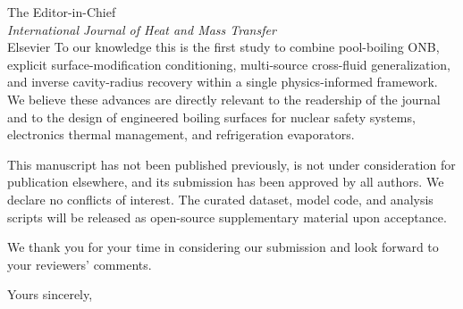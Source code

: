\documentclass[11pt,a4paper]{letter}
\begin{document}
\begin{letter}{The Editor-in-Chief\\
\emph{International Journal of Heat and Mass Transfer}\\
Elsevier}
To our knowledge this is the first study to combine pool-boiling ONB,
explicit surface-modification conditioning, multi-source cross-fluid
generalization, and inverse cavity-radius recovery within a single
physics-informed framework. We believe these advances are directly
relevant to the readership of the journal and to the design of
engineered boiling surfaces for nuclear safety systems, electronics
thermal management, and refrigeration evaporators.

This manuscript has not been published previously, is not under
consideration for publication elsewhere, and its submission has been
approved by all authors. We declare no conflicts of interest. The
curated dataset, model code, and analysis scripts will be released as
open-source supplementary material upon acceptance.

We thank you for your time in considering our submission and look
forward to your reviewers' comments.

\closing{Yours sincerely,}

\end{letter}
\end{document}
